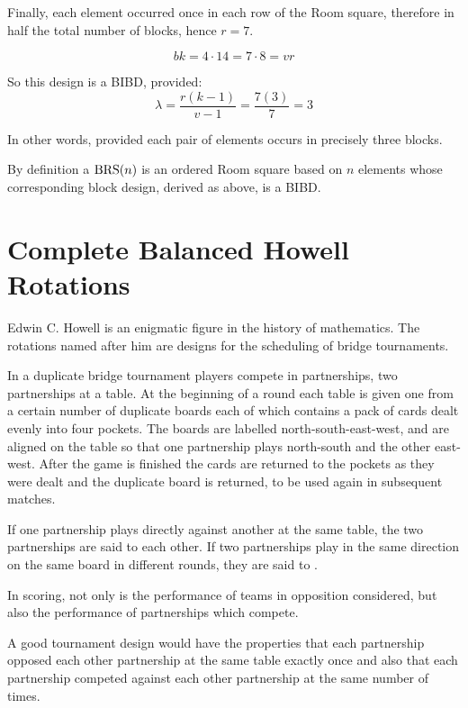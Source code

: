 Finally, each element occurred once in each row of the Room square, therefore in half the total number of blocks, hence $r = 7$.

\begin{equation}
bk = 4\cdot 14 = 7 \cdot 8 = vr
\end{equation}

So this design is a BIBD, provided:
\begin{equation}
\lambda = \frac{r(k - 1)}{v - 1} = \frac{7(3)}{7} = 3
\end{equation}

In other words, provided each pair of elements occurs in precisely three blocks.

By definition a  $\operatorname{BRS}(n)$ is an ordered Room square based on $n$ elements whose corresponding block design, derived as above, is a BIBD.

\section{Complete Balanced Howell Rotations}

Edwin C. Howell is an enigmatic figure in the history of mathematics.
The rotations named after him are designs for the scheduling of bridge tournaments.

In a duplicate bridge tournament players compete in partnerships, two partnerships at a table.
At the beginning of a round each table is given one from a certain number of duplicate boards each of which contains a pack of cards dealt evenly into four pockets.
The boards are labelled north-south-east-west, and are aligned on the table so that one partnership plays north-south and the other east-west.
After the game is finished the cards are returned to the pockets as they were dealt and the duplicate board is returned, to be used again in subsequent matches.

If one partnership plays directly against another at the same table, the two partnerships are said to  each other.
If two partnerships play in the same direction on the same board in different rounds, they are said to .

In scoring, not only is the performance of teams in opposition considered, but also the performance of partnerships which compete.

A good tournament design would have the properties that each partnership opposed each other partnership at the same table exactly once and also that each partnership competed against each other partnership at the same number of times.

